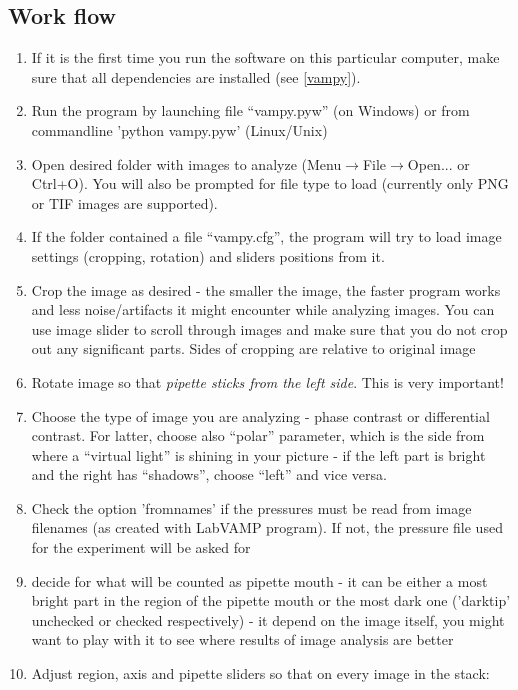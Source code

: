 \documentclass[a4paper,12pt]{article}
\begin{document}
\subsection{Work flow}\label{vampy-work}
\begin{enumerate}
	\item If it is the first time you run the software on this particular computer, make sure that all dependencies are installed (see \ref{vampy}).
	\item Run the program by launching file ``vampy.pyw'' (on Windows) or from commandline 'python vampy.pyw' (Linux/Unix)
	\item Open desired folder with images to analyze (Menu$\rightarrow$File$\rightarrow$Open... or Ctrl+O). You will also be prompted for file type to load (currently only PNG or TIF images are supported).
	\item If the folder contained a file ``vampy.cfg'', the program will try to load image settings (cropping, rotation) and sliders positions from it.
	\item Crop the image as desired - the smaller the image, the faster program works and less noise/artifacts it might encounter while analyzing images. You can use image slider to scroll through images and make sure that you do not crop out any significant parts. Sides of cropping are relative to original image
	\item Rotate image so that \emph{pipette sticks from the left side}. This is very important!
	\item Choose the type of image you are analyzing - phase contrast or differential contrast. For latter, choose also ``polar'' parameter, which is the side from where a ``virtual light'' is shining in your picture - if the left part is bright and the right has ``shadows'', choose ``left'' and vice versa.
	\item Check the option 'fromnames' if the pressures must be read from image filenames (as created with LabVAMP program). If not, the pressure file used for the experiment will be asked for
	\item decide for what will be counted as pipette mouth - it can be either a most bright part in the region of the pipette mouth or the most dark one ('darktip' unchecked or checked respectively) - it depend on the image itself, you might want to play with it to see where results of image analysis are better
	\item Adjust region, axis and pipette sliders so that on every image in the stack:
	\begin{itemize}

\end{itemize}
\end{enumerate}
\end{document}
